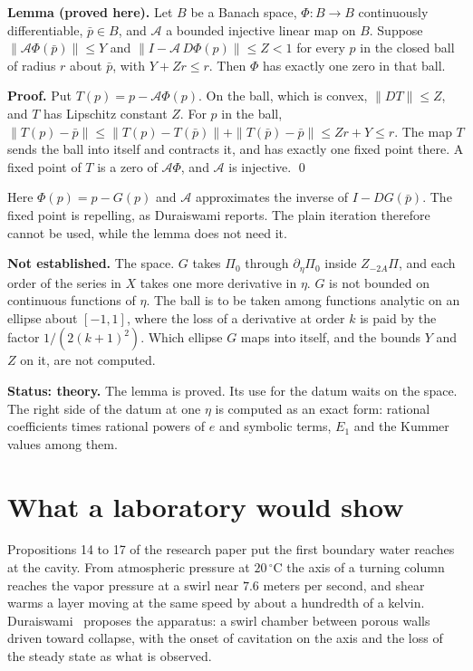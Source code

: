 \textbf{Lemma (proved here).} Let $B$ be a Banach space, $\Phi : B \to B$ continuously
differentiable, $\bar p \in B$, and $\mathcal{A}$ a bounded injective linear map on $B$. Suppose
$\|\mathcal{A}\Phi(\bar p)\| \le Y$ and $\|I - \mathcal{A}\,D\Phi(p)\| \le Z < 1$ for every $p$ in
the closed ball of radius $r$ about $\bar p$, with $Y + Zr \le r$. Then $\Phi$ has exactly one
zero in that ball.

\textbf{Proof.} Put $T(p) = p - \mathcal{A}\Phi(p)$. On the ball, which is convex,
$\|DT\| \le Z$, and $T$ has Lipschitz constant $Z$. For $p$ in the ball,
$\|T(p) - \bar p\| \le \|T(p) - T(\bar p)\| + \|T(\bar p) - \bar p\| \le Zr + Y \le r$. The map $T$
sends the ball into itself and contracts it, and has exactly one fixed point there. A fixed point
of $T$ is a zero of $\mathcal{A}\Phi$, and $\mathcal{A}$ is injective. \qed

Here $\Phi(p) = p - G(p)$ and $\mathcal{A}$ approximates the inverse of $I - DG(\bar p)$. The
fixed point is repelling, as Duraiswami reports. The plain iteration therefore cannot be used,
while the lemma does not need it.

\textbf{Not established.} The space. $G$ takes $\Pi_0$ through $\partial_\eta\Pi_0$ inside
$Z_{-2A}\Pi$, and each order of the series in $X$ takes one more derivative in $\eta$. $G$ is not
bounded on continuous functions of $\eta$. The ball is to be taken among functions analytic on an
ellipse about $[-1,1]$, where the loss of a derivative at order $k$ is paid by the factor
$1/(2(k+1)^2)$. Which ellipse $G$ maps into itself, and the bounds $Y$ and $Z$ on it, are not
computed.

\textbf{Status: theory.} The lemma is proved. Its use for the datum waits on the space. The
right side of the datum at one $\eta$ is computed as an exact form: rational coefficients times
rational powers of $e$ and symbolic terms, $E_1$ and the Kummer values among them.

\section{What a laboratory would show}

Propositions 14 to 17 of the research paper put the first boundary water reaches at the cavity.
From atmospheric pressure at $20\,^\circ$C the axis of a turning column reaches the vapor pressure
at a swirl near $7.6$ meters per second, and shear warms a layer moving at the same speed by about
a hundredth of a kelvin. Duraiswami~\cite{src:Duraiswami-2026} proposes the apparatus: a swirl
chamber between porous walls driven toward collapse, with the onset of cavitation on the axis and
the loss of the steady state as what is observed.

